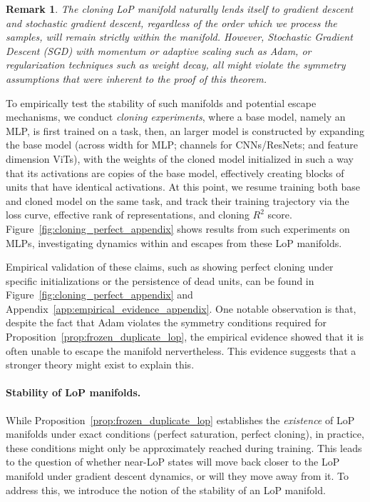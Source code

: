 \documentclass{article}
\newcommand{\GIU}[1]{\todo[color=purple!30,size=\tiny]{GIU: #1}}
\newtheorem{remark}{Remark}[section]
\numberwithin{figure}{section}
\begin{document}
\begin{remark}
The cloning LoP manifold naturally lends itself to gradient descent and stochastic gradient descent, regardless of the order which we process the samples, will remain strictly within the manifold. However, Stochastic Gradient Descent (SGD) with momentum or adaptive scaling such as Adam, or regularization techniques such as weight decay, all might violate the symmetry assumptions that were inherent to the proof of this theorem.
\end{remark}

To empirically test the stability of such manifolds and potential escape mechanisms, we conduct \emph{cloning experiments}, where a base model, namely an MLP, is first trained on a task, then, an larger model is constructed by expanding the base model (across width for MLP; channels for CNNs/ResNets; and feature dimension ViTs), with the weights of the cloned model initialized in such a way that its activations are copies of the base model, effectively creating blocks of units that have identical activations. At this point, we resume training both base and cloned model on the same task, and track their training trajectory via the loss curve, effective rank of representations, and cloning $R^2$ score. Figure~\ref{fig:cloning_perfect_appendix} shows results from such experiments on MLPs, investigating dynamics within and escapes from these LoP manifolds.

Empirical validation of these claims, such as showing perfect cloning under specific initializations  or the persistence of dead units, can be found in Figure~\ref{fig:cloning_perfect_appendix} and Appendix~\ref{app:empirical_evidence_appendix}. One notable observation is that, despite the fact that Adam violates the symmetry conditions required for Proposition~\ref{prop:frozen_duplicate_lop}, the empirical evidence showed that it is often unable to escape the manifold nervertheless. This evidence suggests that a stronger theory might exist to explain this.


\paragraph{Stability of LoP manifolds.}
While Proposition~\ref{prop:frozen_duplicate_lop} establishes the \emph{existence} of LoP manifolds under exact conditions (perfect saturation, perfect cloning), in practice, these conditions might only be approximately reached during training. This leads to the question of whether  near-LoP states will move back closer to the LoP manifold under gradient descent dynamics, or will they move away from it. To address this, we introduce the notion of the stability of an LoP manifold.
\end{document}
